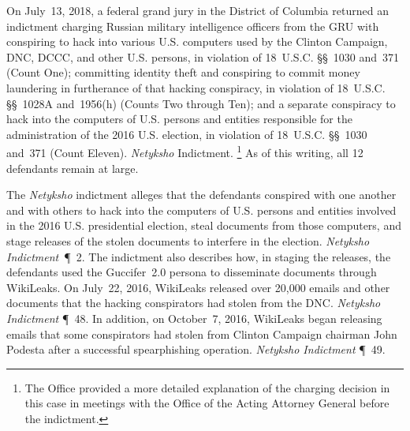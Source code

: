 On July~13, 2018, a federal grand jury in the District of Columbia returned an indictment charging Russian military intelligence officers from the GRU with conspiring to hack into various U.S. computers used by the Clinton Campaign, DNC, DCCC, and other U.S. persons, in violation of 18~U.S.C. \S\S~1030 and~371 (Count One); committing identity theft and conspiring to commit money laundering in furtherance of that hacking conspiracy, in violation of 18~U.S.C. \S\S~1028A and~1956(h) (Counts Two through Ten); and a separate conspiracy to hack into the computers of U.S. persons and entities responsible for the administration of the 2016 U.S. election, in violation of 18~U.S.C. \S\S~1030 and~371 (Count Eleven).
\textit{Netyksho} Indictment.%
\footnote{The Office provided a more detailed explanation of the charging decision in this case in meetings with the Office of the Acting Attorney General before the indictment.}
As of this writing, all 12 defendants remain at large.

The \textit{Netyksho} indictment alleges that the defendants conspired with one another and with others to hack into the computers of U.S. persons and entities involved in the 2016 U.S. presidential election, steal documents from those computers, and stage releases of the stolen documents to interfere in the election.
\textit{Netyksho Indictment}~\P~2.
The indictment also describes how, in staging the releases, the defendants used the Guccifer~2.0 persona to disseminate documents through WikiLeaks.
On July~22, 2016, WikiLeaks released over 20,000 emails and other documents that the hacking conspirators had stolen from the DNC\null.
\textit{Netyksho Indictment} \P~48.
In addition, on October~7, 2016, WikiLeaks began releasing emails that some conspirators had stolen from Clinton Campaign chairman John Podesta after a successful spearphishing operation.
\textit{Netyksho Indictment} \P~49.




